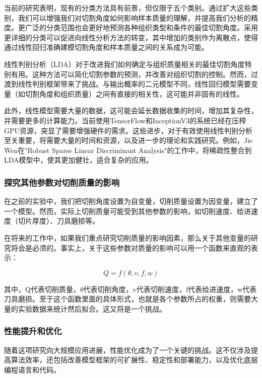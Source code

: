 当前的研究表明，现有的分类方法具有前景，但仅限于五个类别。通过扩大这些类别，我们可以增强我们对切割角度如何影响样本质量的理解，并提高我们分析的精度。更广泛的分类范围也会更好地预测各种组织类型和条件的最佳切割角度。采用更详细的分类可以促进向线性分析方法的转变，其中增加的类别作为离散点，使得通过线性回归准确建模切割角度和样本质量之间的关系成为可能。

线性判别分析（LDA）对于改进我们如何确定与组织质量相关的最佳切割角度特别有用。这种方法可以简化切割参数的预测，并改善对组织切割的控制。然而，过渡到线性判别框架带来了挑战。与输出概率的二元模型不同，线性回归模型需要变量（如切割角度和组织质量）之间有直接的相关性，这可能并非固有的线性。

此外，线性模型需要大量的数据，这可能会延长数据收集的时间，增加其复杂性，并需要更多的计算能力。当前使用TensorFlow和InceptionV3的系统已经在压榨GPU资源，突显了需要增强硬件的需求。这些进步，对于有效使用线性判别分析至关重要，将需要大量的时间和资源，以及进一步的理论和实践研究。例如，Jie Wen在"Robust Sparse Linear Discriminant Analysis"的工作中，将稀疏性整合到LDA模型中，使其更加健壮，适合复杂的应用\cite{6.1}。

\subsubsection{探究其他参数对切削质量的影响}

在之前的实验中，我们把切削角度设置为自变量，切削质量设置为因变量，建立了一个模型。然而，实际上切削质量可能受到其他参数的影响，如切削速度、给进速度（切片厚度）、刀具磨损等。

在将来的工作中，如果我们重点研究切削质量的影响因素，那么关于其他变量的研究将会是必须的。事实上，关于这些参数对质量的影响可以用一个函数来直观的表示：

\begin{equation}
    Q = f(\theta, v, f, w)
\end{equation}

其中，Q代表切削质量，$\theta$代表切削角度，v代表切削速度，f代表给进速度，w代表刀具磨损。至于这个函数里面的具体形式，也就是各个参数所占的权重，则需要大量的实验数据来统计然后拟合。这又将是一个挑战。


\subsubsection{性能提升和优化}

随着这项研究向大规模应用进展，性能优化成为了一个关键的挑战。这不仅涉及提高算法效率，还包括改善模型框架的可扩展性、稳定性和部署能力，以及优化底层编程语言和代码。

